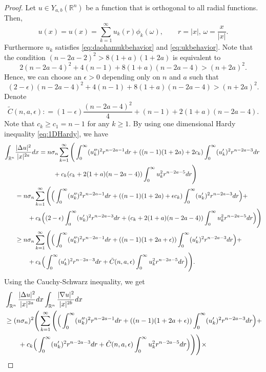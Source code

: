 \documentclass[a4paper,12pt]{article}
\theoremstyle{plain}
\theoremstyle{definition}
\theoremstyle{remark}
\def\R{\mathbb R}%
\def\irn{\int_{\R^n}}
\numberwithin{equation}{section}
\begin{document}
\begin{proof}
Let $u\in Y_{a,b}(\R^n)$ be a function that is orthogonal to all radial functions. Then, 
\[
u(x) = u(x) = \sum_{k=1}^\infty u_k(r) \phi_k(\omega),\qquad r = |x|, \,\omega = \frac x{|x|}.
\]
Furthermore $u_k$ satisfies \eqref{eq:daohamukbehavior} and \eqref{eq:ukbehavior}. Note that the condition $(n-2a -2)^2 > 8(1+a)(1+2a)$ is equivalent to
\[
2(n-2a-4)^2 + 4(n-1) + 8(1+a)(n-2a -4) > (n+2a)^2.
\]
Hence, we can choose an $\epsilon >0$ depending only on $n$ and $a$ such that
\begin{equation}\label{eq:chooseep}
(2-\epsilon)(n-2a-4)^2 + 4(n-1) + 8(1+a)(n-2a -4) > (n+2a)^2.
\end{equation}
Denote
\[
 \tilde{C}(n,a,\epsilon) : = (1-\epsilon)\frac{(n-2a-4)^2}4 + (n-1) + 2(1+a)(n-2a -4).
\]
Note that $c_k \geq c_1 = n-1$ for any $k\geq 1$. By using one dimensional Hardy inequality \eqref{eq:1DHardy}, we have
\begin{align*}
\irn &\frac{|\Delta u|^2}{|x|^{2a}} dx =n\sigma_n \sum_{k=1}^\infty\Bigg(\int_0^\infty (u_k'')^2 r^{n-2a -1} dr + ((n-1)(1+2a) +2c_k) \int_0^\infty (u_k')^2 r^{n-2a -3} dr\notag\\
&\qquad\qquad\qquad + c_k(c_k + 2(1+a)(n-2a -4))\int_0^\infty u_k^2 r^{n -2a -5} dr\Bigg)\\
&=n\sigma_n \sum_{k=1}^\infty\Bigg(\Big(\int_0^\infty (u_k'')^2 r^{n-2a -1} dr + ((n-1)(1+2a) +\epsilon c_k)\int_0^\infty (u_k')^2 r^{n-2a -3} dr\Big) +\notag\\
&\qquad +c_k\Big((2-\epsilon) \int_0^\infty (u_k')^2 r^{n-2a -3} dr + (c_k + 2(1+a)(n-2a -4))\int_0^\infty u_k^2 r^{n -2a -5} dr\Big)\Bigg)\notag\\
&\geq n\sigma_n \sum_{k=1}^\infty\Bigg(\Big(\int_0^\infty (u_k'')^2 r^{n-2a -1} dr + ((n-1)(1+2a+\epsilon))\int_0^\infty (u_k')^2 r^{n-2a -3} dr\Big) +\notag\\
&\qquad +c_k\Big(\int_0^\infty (u_k')^2 r^{n-2a -3} dr + \tilde C(n,a,\epsilon)\int_0^\infty u_k^2 r^{n -2a -5} dr\Big)\Bigg).
\end{align*}
Using  the Cauchy-Schwarz inequality, we get
\begin{align}\label{eq:decompose2ndCKN1}
&\irn \frac{|\Delta u|^2}{|x|^{2a}} dx \irn \frac{|\nabla u|^2}{|x|^{2b}} dx\notag\\
&\geq (n\sigma_n)^2 \Bigg(\sum_{k=1}^\infty\Bigg(\Big(\int_0^\infty (u_k'')^2 r^{n-2a -1} dr + ((n-1)(1+2a+\epsilon))\int_0^\infty (u_k')^2 r^{n-2a -3} dr\Big) +\notag\\
&\qquad +c_k\Big(\int_0^\infty (u_k')^2 r^{n-2a -3} dr +  \tilde{C}(n,a,\epsilon)\int_0^\infty u_k^2 r^{n -2a -5} dr\Big)\Bigg)\Bigg)\times\notag\\

\end{align}
\end{proof}
\end{document}
